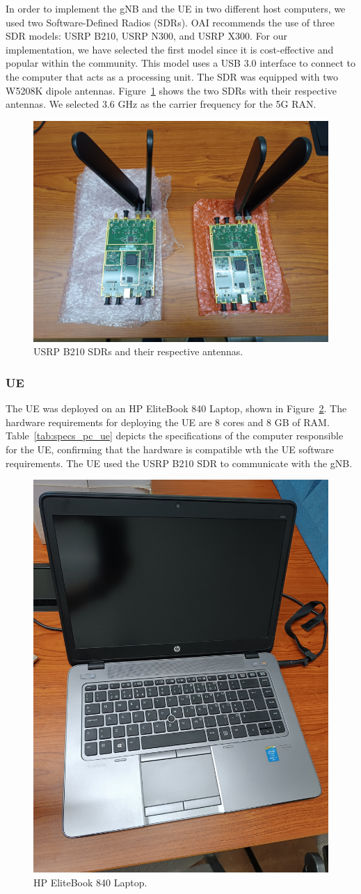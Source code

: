 In order to implement the gNB and the UE in two different host computers, we used two Software-Defined Radios (SDRs).
OAI recommends the use of three SDR models: USRP B210, USRP N300, and USRP X300\@ \cite{openairinterface_tutorial}.
For our implementation, we have selected the first model since it is cost-effective and popular within the community.
This model uses a USB 3.0 interface to connect to the computer that acts as a processing unit.
The SDR was equipped with two W5208K dipole antennas.
Figure~\ref{fig:SDRs} shows the two SDRs with their respective antennas.
We selected 3.6 GHz as the carrier frequency for the 5G RAN\@.

\begin{figure}[H]
    \centering
    \includegraphics[width=0.5\linewidth]{figures/SDRs}
    \caption{USRP B210 SDRs and their respective antennas.}
    \label{fig:SDRs}
\end{figure}



\subsubsection{UE}
The UE was deployed on an HP EliteBook 840 Laptop, shown in Figure~\ref{fig:computer_hp}.
The hardware requirements for deploying the UE are 8 cores and 8 GB of RAM\@.
Table~\ref{tab:specs_pc_ue} depicts the specifications of the computer responsible for the UE\@, confirming that the hardware is compatible wth the UE software requirements.
The UE used the USRP B210 SDR to communicate with the gNB\@.

\begin{figure}[H]
    \centering
    \includegraphics[width=0.3\linewidth]{figures/hp}
    \caption{HP EliteBook 840 Laptop.}
    \label{fig:computer_hp}
\end{figure}

